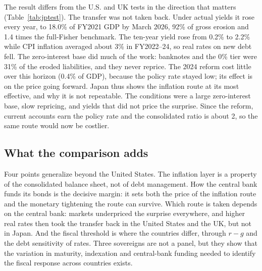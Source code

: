 

The result differs from the U.S. and UK tests in the direction that matters (Table~\ref{tab:jptest}). The transfer was not taken back. Under actual yields it rose every year, to 18.0\% of FY2021 GDP by March 2026, 92\% of gross erosion and 1.4 times the full-Fisher benchmark. The ten-year yield rose from 0.2\% to 2.2\% while CPI inflation averaged about 3\% in FY2022--24, so real rates on new debt fell. The zero-interest base did much of the work: banknotes and the 0\% tier were 31\% of the eroded liabilities, and they never reprice. The 2024 reform cost little over this horizon (0.4\% of GDP), because the policy rate stayed low; its effect is on the price going forward. Japan thus shows the inflation route at its most effective, and why it is not repeatable. The conditions were a large zero-interest base, slow repricing, and yields that did not price the surprise. Since the reform, current accounts earn the policy rate and the consolidated ratio is about 2, so the same route would now be costlier.

\subsection{What the comparison adds}\label{sec:intlsummary}

Four points generalize beyond the United States. The inflation layer is a property of the consolidated balance sheet, not of debt management. How the central bank funds its bonds is the decisive margin: it sets both the price of the inflation route and the monetary tightening the route can survive. Which route is taken depends on the central bank: markets underpriced the surprise everywhere, and higher real rates then took the transfer back in the United States and the UK, but not in Japan. And the fiscal threshold is where the countries differ, through $r-g$ and the debt sensitivity of rates. Three sovereigns are not a panel, but they show that the variation in maturity, indexation and central-bank funding needed to identify the fiscal response across countries exists.
